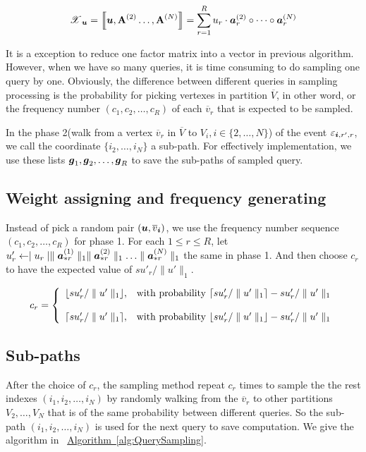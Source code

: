 \documentclass[letterpaper]{article}
\newcommand{\T}[1]{\boldsymbol{\mathscr{\MakeUppercase{#1}}}}
\newcommand{\KT}[1]{\left\llbracket #1 \right\rrbracket}
\newcommand{\V}[1]{{\bm{{\MakeLowercase{#1}}}}}
\newcommand{\VnC}[3]{\V{#1}^{(#2)}_{#3}}
\newcommand{\Vacol}[1]{\V{a}^{(#1)}_{*r}}
\newcommand{\M}[1]{{\bm{\mathbf{\MakeUppercase{#1}}}}}
\newcommand{\Mn}[2]{\M{#1}^{(#2)}}
\newcommand{\norm}[2]{\parallel#1\parallel_{#2}}
\newcommand{\Alg}[1] {\hyperref[alg:#1] {Algorithm~\ref*{alg:#1}}}
\begin{document}
\begin{equation}\label{eq:RankTensorCP}
\T{X}_{\V{u}}= \KT{ \V{u},\Mn{A}{2}\dots,\Mn{A}{N}} =
\sum_{r=1}^{R} u_r \cdot \VnC{A}{2}{r}\circ \cdots \circ \VnC{A}{N}{r}
\end{equation}

It is a exception to reduce one factor matrix into a vector in previous algorithm. However, when we have so many queries, it is time consuming to do sampling one query by one. Obviously, the difference between different queries in sampling processing is the probability for picking vertexes in partition $\overline{V}$, in other word, or the frequency number $(c_1,c_2,\ldots,c_R)$ of each $\overline{v}_r$ that is expected to be sampled.

In the phase 2(walk from a vertex $\overline{v}_r$ in $\overline{V}$ to $V_i,i\in\{2,\ldots,N\}$) of the event $\varepsilon_{\V{i},r',r}$, we call the coordinate $\{i_2,\ldots,i_N\}$ a sub-path. For effectively implementation, we use these lists $\V{g}_1,\V{g}_2,\ldots,\V{g}_R$ to save the sub-paths of sampled query.


\subsection{Weight assigning and frequency generating}
Instead of pick a random pair $(\V{u},\overline{v}_{\V{i}})$, we use the frequency number sequence $(c_1,c_2,\ldots,c_R)$ for phase 1. For each $1 \leq r \leq R$, let $u'_r \leftarrow \mid u_r\mid \norm{\Vacol{1}}{1} \norm{\Vacol{2}}{1} \ldots \norm{\Vacol{N}}{1}$ the same in phase 1.
And then choose $c_r$ to have the expected value of $su'_r/\norm{u'}{1}$.

 \begin{equation*}c_r=
    \left\{
      \begin{array}{ll}
        \lfloor su'_r/\norm{u'}{1} \rfloor,
        & \hbox{with probability $\lceil su'_r/\norm{u'}{1} \rceil - su'_r/\norm{u'}{1}$} \\\\
        \lceil su'_r/\norm{u'}{1} \rceil,
        & \hbox{with probability $\lfloor su'_r/\norm{u'}{1} \rfloor - su'_r/\norm{u'}{1}$}
      \end{array}
    \right.
    \end{equation*}

\subsection{Sub-paths}
After the choice of $c_r$, the sampling method repeat $c_r$ times to sample the the rest indexes $(i_1,i_2,\ldots,i_N)$ by randomly walking from the $\overline{v}_r$ to other partitions $V_2,\ldots,V_N$ that is of the same probability between different queries. So the sub-path $(i_1,i_2,\ldots,i_N)$ is used for the next query to save computation. We give the algorithm in ~\Alg{QuerySampling}.
\end{document}
